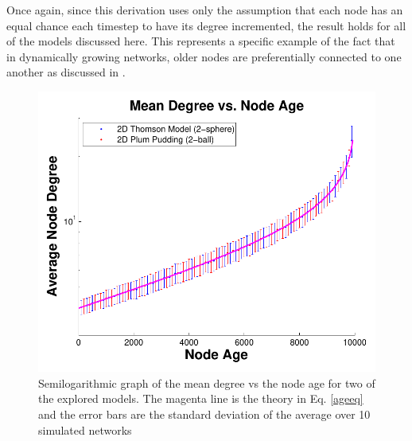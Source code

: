 \documentclass[aps,pre,reprint,superscriptaddress,amsmath,amssymb,nofootinbib]{revtex4-1}
\begin{document}
Once again, since this derivation uses only the assumption that each node has an equal chance each timestep to have its degree incremented, the result holds for all of the models discussed here.
This represents a specific example of the fact that in dynamically growing networks, older nodes are preferentially connected to one another as discussed in \cite{reallyrandom}.
\begin{figure}
\includegraphics[width=\linewidth]{figures/fig12.pdf}
\caption{\label{degage}Semilogarithmic graph of the mean degree vs the node age for two of the explored models. The magenta line is the theory in Eq. \eqref{ageeq} and the error bars are the standard deviation of the average over 10 simulated networks}
\end{figure}

\end{document}
